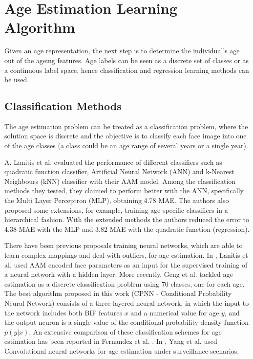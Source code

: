 \section{Age Estimation Learning Algorithm}
Given an age representation, the next step is to determine the individual's age out of the ageing features. Age labels can be seen as a discrete set of classes or as a continuous label space, hence classification and regression learning methods can be used.

\subsection{Classification Methods}

The age estimation problem can be treated as a classification problem, where the solution space is discrete and the objective is to classify each face image into one of the age classes (a class could be an age range of several years or a single year).

A. Lanitis et al. \cite{Lanitis:2004:CDC:2225304.2226166} evaluated the performance of different classifiers such as quadratic function classifier, Artificial Neural Network (ANN) and k-Nearest Neighbours (kNN) classifier with their AAM model. Among the classification methods they tested, they claimed to perform better with the ANN, specifically the Multi Layer Perceptron (MLP), obtaining 4.78 MAE. The authors also proposed some extensions, for example, training age specific classifiers in a hierarchical fashion. With the extended methods the authors reduced the error to 4.38 MAE with the MLP and 3.82 MAE with the quadratic function (regression).

There have been previous proposals training neural networks,
which are able to learn complex mappings and deal with
outliers, for age estimation. In \cite{Lanitis:2004:CDC:2225304.2226166}, Lanitis et al. used AAM encoded face parameters as an input for the supervised training
of a neural network with a hidden layer. More recently, Geng
et al. \cite{6475129} tackled age estimation as a discrete classification problem using 70 classes, one for each age. The best algorithm proposed in this work (CPNN - Conditional Probability Neural Network) consists of a three-layered neural network, in which the input to the network includes both BIF features $x$ and a numerical value for age $y$, and the output neuron is a single value of the conditional probability density function $p(y|x)$. An extensive comparison of these classification schemes for age estimation has been reported in Fernandez et al. \cite{2014icprw}. In \cite{5995481}, Yang et al. used Convolutional neural networks for age estimation under surveillance scenarios.


